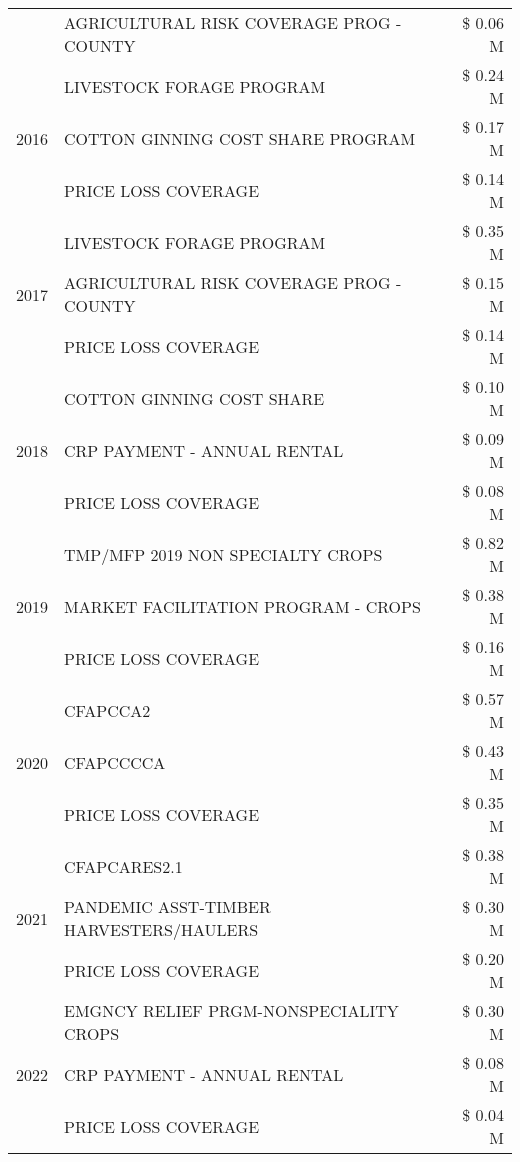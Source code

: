 \begin{tabular}{llr}
 & AGRICULTURAL RISK COVERAGE PROG - COUNTY & \$ 0.06 M \\
\cline{1-3}
\multirow[t]{3}{*}{2016} & LIVESTOCK FORAGE PROGRAM & \$ 0.24 M \\
 & COTTON GINNING COST SHARE PROGRAM & \$ 0.17 M \\
 & PRICE LOSS COVERAGE & \$ 0.14 M \\
\cline{1-3}
\multirow[t]{3}{*}{2017} & LIVESTOCK FORAGE PROGRAM & \$ 0.35 M \\
 & AGRICULTURAL RISK COVERAGE PROG - COUNTY & \$ 0.15 M \\
 & PRICE LOSS COVERAGE & \$ 0.14 M \\
\cline{1-3}
\multirow[t]{3}{*}{2018} & COTTON GINNING COST SHARE & \$ 0.10 M \\
 & CRP PAYMENT - ANNUAL RENTAL & \$ 0.09 M \\
 & PRICE LOSS COVERAGE & \$ 0.08 M \\
\cline{1-3}
\multirow[t]{3}{*}{2019} & TMP/MFP 2019 NON SPECIALTY CROPS & \$ 0.82 M \\
 & MARKET FACILITATION PROGRAM - CROPS & \$ 0.38 M \\
 & PRICE LOSS COVERAGE & \$ 0.16 M \\
\cline{1-3}
\multirow[t]{3}{*}{2020} & CFAPCCA2 & \$ 0.57 M \\
 & CFAPCCCCA & \$ 0.43 M \\
 & PRICE LOSS COVERAGE & \$ 0.35 M \\
\cline{1-3}
\multirow[t]{3}{*}{2021} & CFAPCARES2.1 & \$ 0.38 M \\
 & PANDEMIC ASST-TIMBER HARVESTERS/HAULERS & \$ 0.30 M \\
 & PRICE LOSS COVERAGE & \$ 0.20 M \\
\cline{1-3}
\multirow[t]{3}{*}{2022} & EMGNCY RELIEF PRGM-NONSPECIALITY CROPS & \$ 0.30 M \\
 & CRP PAYMENT - ANNUAL RENTAL & \$ 0.08 M \\
 & PRICE LOSS COVERAGE & \$ 0.04 M \\
\cline{1-3}
\bottomrule
\end{tabular}
